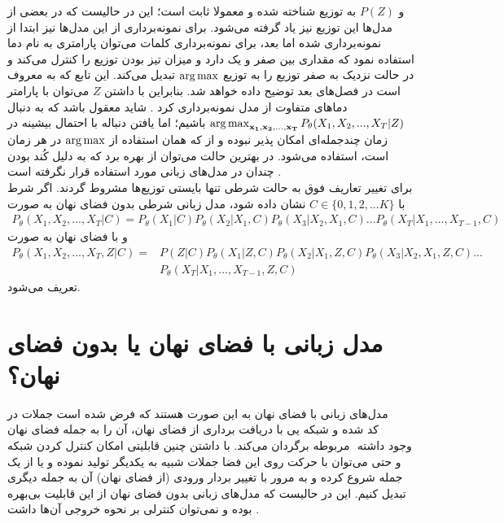 و $P(Z)$ به توزیع
شناخته شده و معمولا ثابت است؛ این در حالیست که در بعضی از مدل‌ها این توزیع نیز یاد گرفته می‌شود. برای نمونه‌برداری از این مدل‌ها نیز ابتدا از \priordist{} نمونه‌برداری شده اما بعد، برای نمونه‌برداری کلمات می‌توان پارامتری به نام دما استفاده نمود که مقداری بین صفر و یک دارد و میزان تیز بودن توزیع را کنترل می‌کند و در حالت نزدیک به صفر توزیع را به توزیع $\operatorname*{arg\,max}$ تبدیل می‌کند. این تابع که به  معروف است در فصل‌های بعد توضیح داده خواهد شد. بنابراین با داشتن $Z$ می‌توان با پارامتر دما‌های متفاوت از مدل نمونه‌برداری کرد \cite{toward}. شاید معقول باشد که به دنبال
$\operatorname*{arg\,max}_{{\bf x_1}, {\bf x_2}, ..., {\bf x_T}} P_\theta(X_1, X_2, ... , X_T|Z)$
باشیم؛ اما یافتن دنباله با احتمال بیشینه در زمان چندجمله‌ای امکان پذیر نبوده و از \greedydecoding{} که همان استفاده از $\operatorname*{arg\,max}$ در هر زمان است، استفاده می‌شود. در بهترین حالت می‌توان از
بهره برد که به دلیل کُند بودن چندان در مدل‌های زبانی مورد استفاده قرار نگرفته است .
\\
برای تغییر تعاریف فوق به حالت شرطی تنها بایستی توزیع‌ها مشروط گردند. اگر شرط با $C \in \{0,1,2,...K\}$ نشان داده شود، مدل زبانی شرطی بدون فضای نهان به صورت
\begin{align}
	P_\theta(X_1, X_2, ... , X_T|C) = P_\theta(X_1|C) P_\theta(X_2|X_1,C) P_\theta(X_3|X_2, X_1,C) ... P_\theta(X_T|X_1, ..., X_{T-1},C)
\end{align}
و با فضای نهان به صورت
\begin{align}
	P_\theta(X_1, X_2, ... , X_T,Z|C) = & P(Z|C) P_\theta(X_1|Z,C) P_\theta(X_2|X_1,Z,C) P_\theta(X_3|X_2, X_1,Z,C) ... \nonumber \\& P_\theta(X_T|X_1, ..., X_{T-1},Z,C)
\end{align}
تعریف می‌شود.
\section{مدل زبانی با فضای نهان یا بدون فضای نهان؟} \label{chap1:latent_or_not}
مدل‌های زبانی با فضای نهان به این صورت هستند که فرض شده است جملات در فضای نهان ‎کد شده و شبکه 
یی 
با دریافت برداری از فضای نهان، آن را به جمله مربوطه برگردان می‌کند. با داشتن چنین قابلیتی امکان کنترل کردن شبکه ‎\decoder{}‎ وجود داشته و حتی می‌توان با حرکت روی این فضا جملات شبیه به یکدیگر تولید نموده و یا از یک جمله شروع کرده و به مرور با تغییر بردار ورودی (از فضای نهان) آن به جمله دیگری تبدیل کنیم. این در حالیست که مدل‌های زبانی بدون فضای نهان از این قابلیت بی‌بهره بوده و نمی‌توان کنترلی بر نحوه خروجی آن‌ها داشت \cite{vae_text}.
